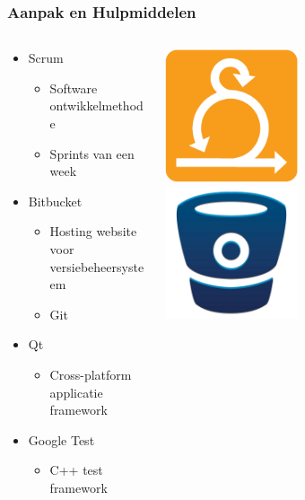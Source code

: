 \begin{frame}\frametitle{Aanpak en Hulpmiddelen}
	\begin{columns}[T]
  		\begin{column}{.7\textwidth}
			\begin{itemize}
				\item Scrum
					\begin{itemize}
						\item Software ontwikkelmethode
						\item Sprints van een week
					\end{itemize}
				\item Bitbucket
					\begin{itemize}
						\item Hosting website voor versiebeheersysteem
						\item Git
					\end{itemize}
				\item Qt
					\begin{itemize}
						\item Cross-platform applicatie framework
					\end{itemize}
				\item Google Test
					\begin{itemize}
						\item C++ test framework
					\end{itemize}
			\end{itemize}
		\end{column}
		\begin{column}{.3\textwidth}
			\includegraphics[width=0.45\textwidth]{images/scrum.png}\\
			\vspace{7mm}
			\includegraphics[width=0.45\textwidth]{images/bitbucket.jpg}\\

\end{column}
\end{columns}
\end{frame}
